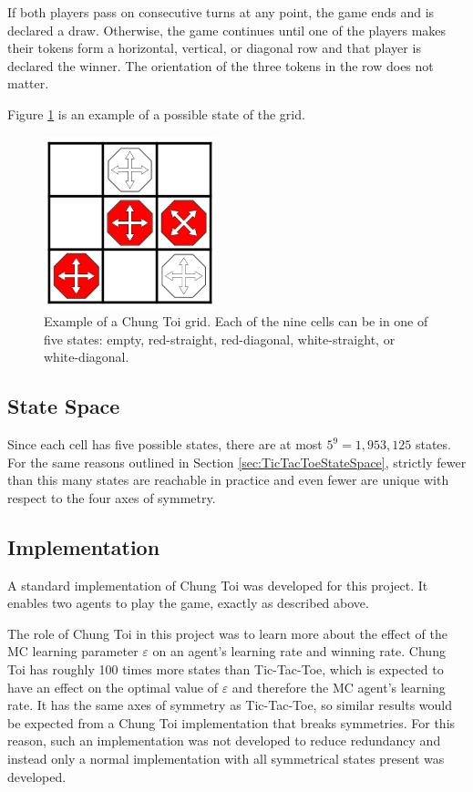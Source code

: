 \documentclass[11pt,a4paper]{report}
\begin{document}
If both players pass on consecutive turns at any point, the game ends and is declared a draw. Otherwise, the game continues until one of the players makes their tokens form a horizontal, vertical, or diagonal row and that player is declared the winner. The orientation of the three tokens in the row does not matter.

Figure \ref{chung-toi-grid-example} is an example of a possible state of the grid.

\begin{figure}[htbp]
	\begin{center}
		\includegraphics[width=50mm]{chung_toi_grid_example.png}
		\caption{Example of a Chung Toi grid. Each of the nine cells can be in one of five states: empty, red-straight, red-diagonal, white-straight, or white-diagonal.}
		\label{chung-toi-grid-example}
	\end{center}
\end{figure}


\subsection{State Space}

Since each cell has five possible states, there are at most $5^9 = 1,953,125$ states. For the same reasons outlined in Section \ref{sec:TicTacToeStateSpace}, strictly fewer than this many states are reachable in practice and even fewer are unique with respect to the four axes of symmetry.


\subsection{Implementation}

A standard implementation of Chung Toi was developed for this project. It enables two agents to play the game, exactly as described above.

The role of Chung Toi in this project was to learn more about the effect of the MC learning parameter $\varepsilon$ on an agent's learning rate and winning rate. Chung Toi has roughly 100 times more states than Tic-Tac-Toe, which is expected to have an effect on the optimal value of $\varepsilon$ and therefore the MC agent's learning rate. It has the same axes of symmetry as Tic-Tac-Toe, so similar results would be expected from a Chung Toi implementation that breaks symmetries. For this reason, such an implementation was not developed to reduce redundancy and instead only a normal implementation with all symmetrical states present was developed.
\end{document}
